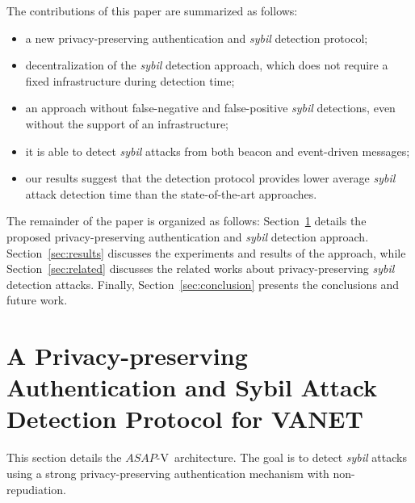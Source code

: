 \documentclass[preprint,12pt]{elsarticle}
\newcommand{\protocolname}{$ASAP$-V}
\begin{document}
The contributions of this paper are summarized as follows:

\begin{itemize}
	\item a new privacy-preserving authentication and \textit{sybil} detection protocol;
	\item decentralization of the \textit{sybil} detection approach, which does not require a fixed infrastructure during detection time;
	\item an approach without false-negative and false-positive \textit{sybil} detections, even without the support of an infrastructure;
	\item it is able to detect \textit{sybil} attacks from both beacon and event-driven messages;
	\item our results suggest that the detection protocol provides lower average \textit{sybil} attack detection time than the state-of-the-art approaches.
\end{itemize}

The remainder of the paper is organized as follows: Section~\ref{sec:solution} details the proposed privacy-preserving authentication and \textit{sybil} detection approach. Section~\ref{sec:results} discusses the experiments and results of the approach, while Section~\ref{sec:related} discusses the related works about privacy-preserving \textit{sybil} detection attacks. Finally, Section~\ref{sec:conclusion} presents the conclusions and future work.

\section{A Privacy-preserving Authentication and Sybil Attack Detection Protocol for VANET}
\label{sec:solution}

This section details the \protocolname~architecture. The goal is to detect \textit{sybil} attacks using a strong privacy-preserving authentication mechanism with non-repudiation.

%
\end{document}

